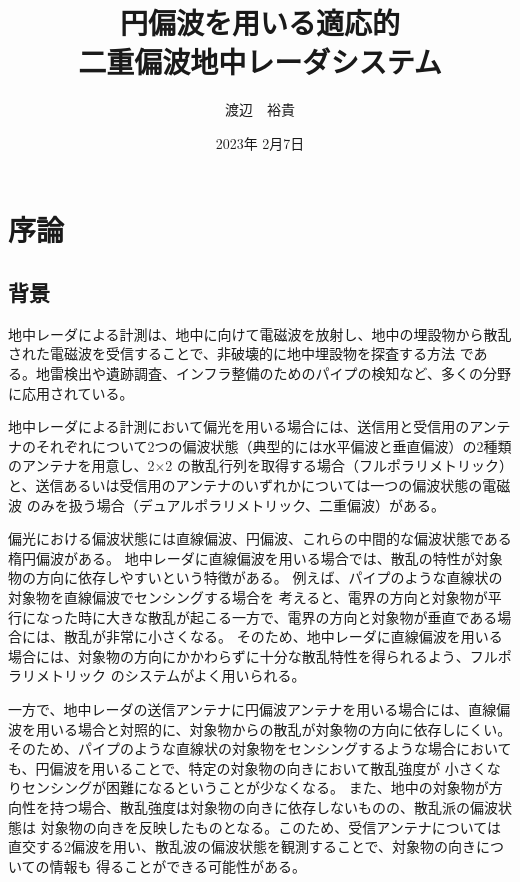 \documentclass[11pt,a4paper,uplatex]{ujarticle}
\title{円偏波を用いる適応的\\二重偏波地中レーダシステム}
\date{2023年 2月7日}
\author{渡辺　裕貴}
\begin{document}
\maketitle
\newpage
\tableofcontents
\newpage
\section{序論}

  \subsection{背景}

  地中レーダによる計測は、地中に向けて電磁波を放射し、地中の埋設物から散乱された電磁波を受信することで、非破壊的に地中埋設物を探査する方法
  である。地雷検出や遺跡調査、インフラ整備のためのパイプの検知など、多くの分野に応用されている\cite{landmine_example}\cite{remains_example}。

  地中レーダによる計測において偏光を用いる場合には、送信用と受信用のアンテナのそれぞれについて2つの偏波状態（典型的には水平偏波と垂直偏波）の2種類のアンテナを用意し、2$\times$2
  の散乱行列を取得する場合（フルポラリメトリック）と、送信あるいは受信用のアンテナのいずれかについては一つの偏波状態の電磁波
  のみを扱う場合（デュアルポラリメトリック、二重偏波）がある。

  偏光における偏波状態には直線偏波、円偏波、これらの中間的な偏波状態である楕円偏波がある。
  地中レーダに直線偏波を用いる場合では、散乱の特性が対象物の方向に依存しやすいという特徴がある。
  例えば、パイプのような直線状の対象物を直線偏波でセンシングする場合を
  考えると、電界の方向と対象物が平行になった時に大きな散乱が起こる一方で、電界の方向と対象物が垂直である場合には、散乱が非常に小さくなる。
  そのため、地中レーダに直線偏波を用いる場合には、対象物の方向にかかわらずに十分な散乱特性を得られるよう、フルポラリメトリック
  のシステムがよく用いられる。

  一方で、地中レーダの送信アンテナに円偏波アンテナを用いる場合には、直線偏波を用いる場合と対照的に、対象物からの散乱が対象物の方向に依存しにくい。
  そのため、パイプのような直線状の対象物をセンシングするような場合においても、円偏波を用いることで、特定の対象物の向きにおいて散乱強度が
  小さくなりセンシングが困難になるということが少なくなる。
  また、地中の対象物が方向性を持つ場合、散乱強度は対象物の向きに依存しないものの、散乱派の偏波状態は
  対象物の向きを反映したものとなる。このため、受信アンテナについては直交する2偏波を用い、散乱波の偏波状態を観測することで、対象物の向きについての情報も
  得ることができる可能性がある。
  
\end{document}
